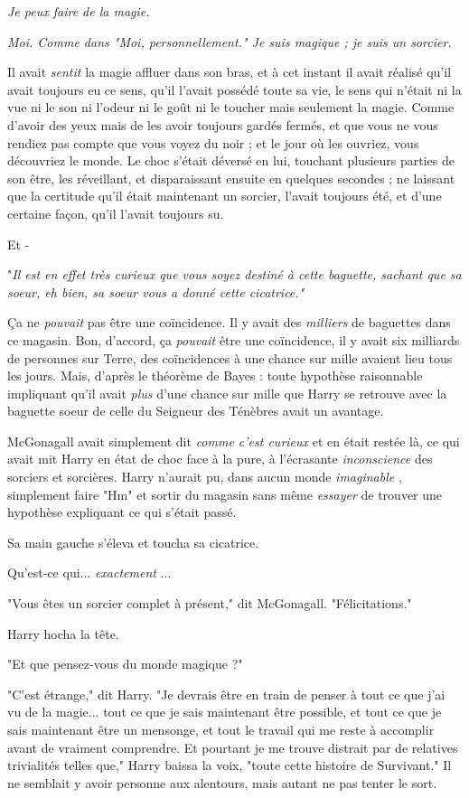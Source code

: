 \emph{Je peux faire de la magie.} 

\emph{Moi. Comme dans "Moi, personnellement." Je suis magique ; je suis un sorcier.} 

Il avait \emph{sentit}  la magie affluer dans son bras, et à cet instant il avait réalisé qu'il avait toujours eu ce sens, qu'il l'avait possédé toute sa vie, le sens qui n'était ni la vue ni le son ni l'odeur ni le goût ni le toucher mais seulement la magie. Comme d'avoir des yeux mais de les avoir toujours gardés fermés, et que vous ne vous rendiez pas compte que vous voyez du noir ; et le jour où les ouvriez, vous découvriez le monde. Le choc s'était déversé en lui, touchant plusieurs parties de son être, les réveillant, et disparaissant ensuite en quelques secondes ; ne laissant que la certitude qu'il était maintenant un sorcier, l'avait toujours été, et d'une certaine façon, qu'il l'avait toujours su.

Et -

"\emph{Il est en effet très curieux que vous soyez destiné à cette baguette, sachant que sa soeur, eh bien, sa soeur vous a donné cette cicatrice."} 

Ça ne \emph{pouvait}  pas être une coïncidence. Il y avait des \emph{milliers}  de baguettes dans ce magasin. Bon, d'accord, ça \emph{pouvait}  être une coïncidence, il y avait six milliards de personnes sur Terre, des coïncidences à une chance sur mille avaient lieu tous les jours. Mais, d'après le théorème de Bayes : toute hypothèse raisonnable impliquant qu'il avait \emph{plus}  d'une chance sur mille que Harry se retrouve avec la baguette soeur de celle du Seigneur des Ténèbres avait un avantage.

McGonagall avait simplement dit \emph{comme c'est curieux}  et en était restée là, ce qui avait mit Harry en état de choc face à la pure, à l'écrasante \emph{inconscience}  des sorciers et sorcières. Harry n'aurait pu, dans aucun monde \emph{imaginable} , simplement faire "Hm" et sortir du magasin sans même \emph{essayer}  de trouver une hypothèse expliquant ce qui s'était passé.

Sa main gauche s'éleva et toucha sa cicatrice.

Qu'est-ce qui... \emph{exactement} ...

"Vous êtes un sorcier complet à présent," dit McGonagall. "Félicitations."

Harry hocha la tête.

"Et que pensez-vous du monde magique ?"

"C'est étrange," dit Harry. "Je devrais être en train de penser à tout ce que j'ai vu de la magie... tout ce que je sais maintenant être possible, et tout ce que je sais maintenant être un mensonge, et tout le travail qui me reste à accomplir avant de vraiment comprendre. Et pourtant je me trouve distrait par de relatives trivialités telles que," Harry baissa la voix, "toute cette histoire de Survivant." Il ne semblait y avoir personne aux alentours, mais autant ne pas tenter le sort.

